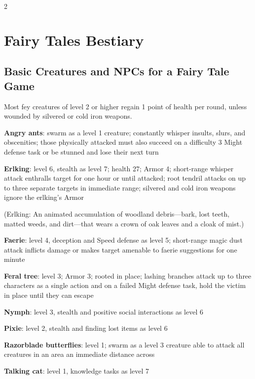 \begin{multicols}{2}

\chapter{Fairy Tales Bestiary}

\section{Basic Creatures and NPCs for a Fairy Tale Game}

Most fey creatures of level 2 or higher regain 1 point of health per round, unless wounded by silvered or cold iron weapons.

\textbf{Angry ants}: swarm as a level 1 creature; constantly whisper insults, slurs, and obscenities; those physically attacked must also succeed on a difficulty 3 Might defense task or be stunned and lose their next turn

\textbf{Erlking}: level 6, stealth as level 7; health 27; Armor 4; short-range whisper attack enthralls target for one hour or until attacked; root tendril attacks on up to three separate targets in immediate range; silvered and cold iron weapons ignore the erlking’s Armor

(Erlking: An animated accumulation of woodland debris—bark, lost teeth, matted weeds, and dirt—that wears a crown of oak leaves and a cloak of mist.)

\textbf{Faerie}: level 4, deception and Speed defense as level 5; short-range magic dust attack inflicts damage or makes target amenable to faerie suggestions for one minute

\textbf{Feral tree}: level 3; Armor 3; rooted in place; lashing branches attack up to three characters as a single action and on a failed Might defense task, hold the victim in place until they can escape

\textbf{Nymph}: level 3, stealth and positive social interactions as level 6

\textbf{Pixie}: level 2, stealth and finding lost items as level 6

\textbf{Razorblade butterflies}: level 1; swarm as a level 3 creature able to attack all creatures in an area an immediate distance across

\textbf{Talking cat}: level 1, knowledge tasks as level 7


\end{multicols}
